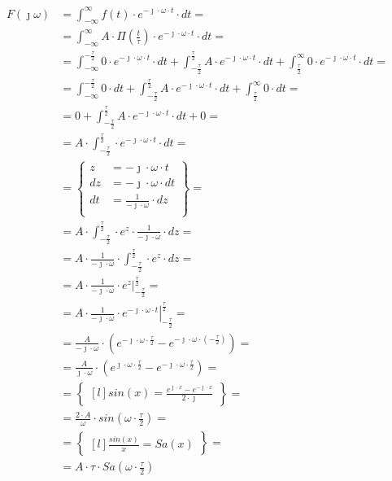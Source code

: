 \begin{task}
\begin{align*}
F(\jmath \omega )&=\int_{-\infty }^{\infty}f(t) \cdot e^{-\jmath \cdot \omega \cdot t}\cdot dt=\\
&=\int_{-\infty }^{\infty} A\cdot\Pi(\frac{t}{\tau})  \cdot e^{-\jmath \cdot \omega \cdot t}\cdot dt=\\
&=\int_{-\infty }^{-\frac{\tau}{2}} 0 \cdot e^{-\jmath \cdot \omega \cdot t}\cdot dt + \int_{-\frac{\tau}{2} }^{\frac{\tau}{2}} A\cdot e^{-\jmath \cdot \omega \cdot t}\cdot dt + \int_{\frac{\tau}{2} }^{\infty} 0\cdot e^{-\jmath \cdot \omega \cdot t}\cdot dt=\\
&=\int_{-\infty }^{-\frac{\tau}{2}} 0 \cdot dt + \int_{-\frac{\tau}{2} }^{\frac{\tau}{2}} A\cdot e^{-\jmath \cdot \omega \cdot t}\cdot dt + \int_{\frac{\tau}{2} }^{\infty} 0 \cdot dt=\\
&=0 + \int_{-\frac{\tau}{2} }^{\frac{\tau}{2}} A\cdot e^{-\jmath \cdot \omega \cdot t}\cdot dt + 0=\\
&=A\cdot \int_{-\frac{\tau}{2} }^{\frac{\tau}{2}} \cdot e^{-\jmath \cdot \omega \cdot t}\cdot dt=\\
&=\begin{Bmatrix}
z&=-\jmath \cdot \omega \cdot t\\
dz&=-\jmath \cdot \omega \cdot dt\\
dt&=\frac{1}{-\jmath \cdot \omega} \cdot dz\\
\end{Bmatrix}=\\
&=A\cdot \int_{-\frac{\tau}{2} }^{\frac{\tau}{2}} \cdot e^{z}\cdot \frac{1}{-\jmath \cdot \omega} \cdot dz=\\
&=A\cdot \frac{1}{-\jmath \cdot \omega} \cdot \int_{-\frac{\tau}{2} }^{\frac{\tau}{2}} \cdot e^{z}\cdot dz=\\
&=A\cdot \frac{1}{-\jmath \cdot \omega} \cdot \left. e^{z}\right|_{-\frac{\tau}{2} }^{\frac{\tau}{2}}=\\
&=A\cdot \frac{1}{-\jmath \cdot \omega} \cdot \left. e^{-\jmath \cdot \omega \cdot t}\right|_{-\frac{\tau}{2} }^{\frac{\tau}{2}}=\\
&=\frac{A}{-\jmath \cdot \omega} \cdot \left(e^{-\jmath \cdot \omega \cdot \frac{\tau}{2}} - e^{-\jmath \cdot \omega \cdot (-\frac{\tau}{2})}\right)=\\
&=\frac{A}{\jmath \cdot \omega} \cdot \left(e^{\jmath \cdot \omega \cdot \frac{\tau}{2}} - e^{-\jmath \cdot \omega \cdot \frac{\tau}{2}}\right)=\\
&=\begin{Bmatrix*}[l]
sin(x)=\frac{e^{\jmath \cdot x} - e^{-\jmath \cdot x}}{2 \cdot \jmath}
\end{Bmatrix*}=\\
&=\frac{2 \cdot A}{\omega} \cdot sin\left(\omega \cdot \frac{\tau}{2}\right)=\\
&=\begin{Bmatrix*}[l]
\frac{sin(x)}{x}=Sa(x)
\end{Bmatrix*}=\\
&=A\cdot \tau \cdot Sa\left(\omega \cdot \frac{\tau}{2}\right)
\end{align*}


\end{task}
